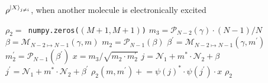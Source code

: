 \documentclass[final,twocolumn]{elsarticle}
\newcommand{\cntsetx}{\mathcal{P}_{N-1}}
\newcommand{\cntsetxx}{\mathcal{P}_{N-2}}
\newcommand{\na}{{\mathcal{N}_{1}}}
\newcommand{\nb}{{\mathcal{N}_{2}}}
\newcommand{\maptoNa}{{\mathcal{M}}_{N-2 \mapsto N-1}}
\newcommand{\pluseq}{\mathrel{+}=}
\begin{document}
\begin{algorithm}
  \caption{$\rho^{\ket{X}_{j\ne i}}$,  when another molecule is electronically excited}\label{alg:rho2}
  \begin{algorithmic}[1]
     \State \texttt{$\rho_2 = $\,numpy.zeros($(M+1,M+1)$)} 
     \State \texttt{$m_3=\cntsetxx(\gamma)\cdot (N-1)/N$} 
      
       \State \texttt{$\beta = \maptoNa(\gamma,m)$}
         \State \texttt{$m_2=\cntsetx(\beta) $} 
      
              \State \texttt{$\beta^\prime = \maptoNa(\gamma,m^\prime)$}
         \State \texttt{$m_2^\prime=\cntsetx(\beta^\prime) $}
             \State $x = m_3/\sqrt{m_2\cdot m_2^\prime}$
           \State \texttt{$j = \na + m^\ast\cdot\nb + \beta $}     
            \State \texttt{$j^\prime = \na + m^\ast\cdot\nb + \beta^\prime $}                
         \State $\rho_2(m,m^\prime) \pluseq  \psi(j)^\ast \cdot \psi(j^\prime) \cdot x$
       	\EndFor 
	\EndFor 
        \EndFor  
       \State \Return $\rho_2$
    \EndFunction
  \end{algorithmic}
\end{algorithm}

\end{document}
